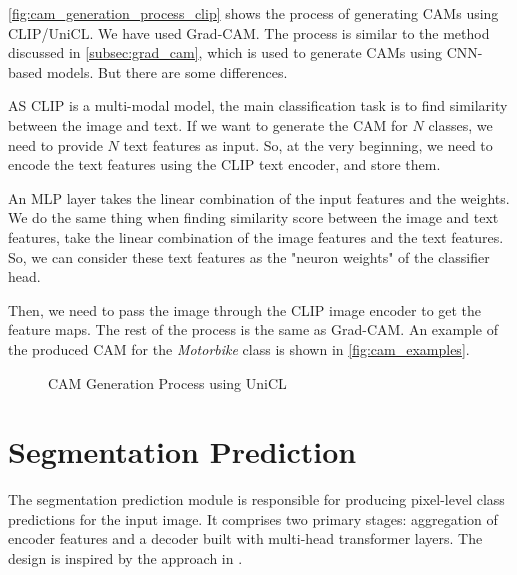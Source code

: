 \autoref{fig:cam_generation_process_clip} shows the process of generating CAMs using CLIP/UniCL. We have used Grad-CAM. The process is similar to the method discussed in \autoref{subsec:grad_cam}, which is used to generate CAMs using CNN-based models.
 But there are some differences.

AS CLIP is a multi-modal model, the main classification task is to find similarity between the image and text. If we want to generate the CAM for $N$ classes, we need to provide $N$ text features as input. So, at the very beginning, we need to encode the text features using the CLIP text encoder, and store them.

An MLP layer takes the linear combination of the input features and the weights. We do the same thing when finding similarity score between the image and text features, take the linear combination of the image features and the text features. So, we can consider these text features as the "neuron weights" of the classifier head.

Then, we need to pass the image through the CLIP image encoder to get the feature maps. The rest of the process is the same as Grad-CAM. An example of the produced CAM for the \textit{Motorbike} class is shown in \autoref{fig:cam_examples}.


\begin{figure}[htbp]
    \centering
    \caption{CAM Generation Process using UniCL}
    \label{fig:cam_generation_process_clip}
\end{figure}

\section{Segmentation Prediction}
\label{sec:segmentation_prediction}
The segmentation prediction module is responsible for producing pixel-level class predictions for the input image. It comprises two primary stages: aggregation of encoder features and a decoder built with multi-head transformer layers. The design is inspired by the approach in \cite{wsss_frozen_clip}.

